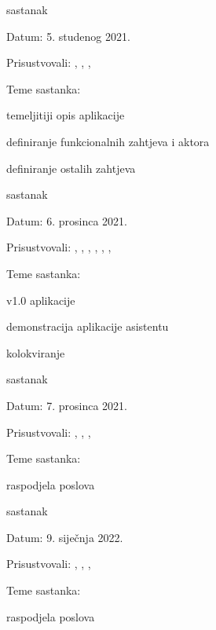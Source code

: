 \begin{packed_enum}
			\item  sastanak
			\item[] \begin{packed_item}
				\item Datum: 5. studenog 2021.
				\item Prisustvovali: \prg, \ske, \vic, \kra
				\item Teme sastanka:
				\begin{packed_item}
					\item  temeljitiji opis aplikacije
					\item  definiranje funkcionalnih zahtjeva i aktora
					\item  definiranje ostalih zahtjeva
				\end{packed_item}
			\end{packed_item}
			
			\item  sastanak	
			\item[] \begin{packed_item}
				\item Datum: 6. prosinca 2021.
				\item Prisustvovali: \prg, \fuc, \ske, \met, \ben, \vic, \kra
				\item Teme sastanka:
				\begin{packed_item}
					\item  v1.0 aplikacije
					\item  demonstracija aplikacije asistentu
					\item  kolokviranje
				\end{packed_item}
			\end{packed_item}
		
			\item  sastanak	
			\item[] \begin{packed_item}
				\item Datum: 7. prosinca 2021.
				\item Prisustvovali: \prg, \ben, \vic, \kra
				\item Teme sastanka:
				\begin{packed_item}
					\item  raspodjela poslova
				\end{packed_item}
			\end{packed_item}
			
			\item  sastanak	
			\item[] \begin{packed_item}
				\item Datum: 9. siječnja 2022.
				\item Prisustvovali: \prg, \ben, \ske, \met
				\item Teme sastanka:
				\begin{packed_item}
					\item  raspodjela poslova
				\end{packed_item}
			\end{packed_item}
		

\end{packed_enum}
